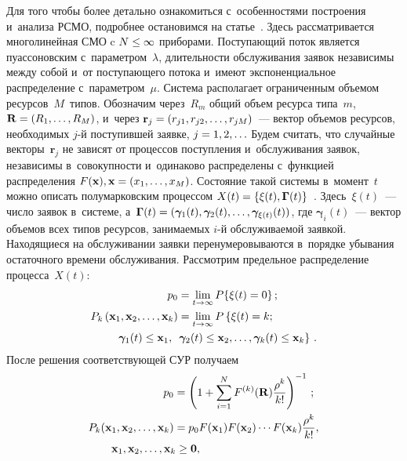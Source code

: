 \begin{multicols}{2}
Для того чтобы более детально ознакомиться с~особенностями построения и~анализа 
РСМО, подробнее остановимся на статье~\cite{Naumov_3_2016}.
Здесь рас\-смат\-ри\-ва\-ет\-ся многолинейная СМО c $N\hm\leq \infty$ приборами. Поступающий 
поток является пуассоновским с~па\-ра\-мет\-ром~$\lambda$, длительности обслуживания 
заявок независимы между собой и~от поступающего потока и~имеют экспоненциальное 
распределение с~параметром~$\mu$. Система располагает ограниченным объемом 
ресурсов~$M$~типов.
Обозначим через~$R_m$ общий объем ресурса типа~$m$, $\mathbf{R}\hm=(R_1,\ldots,R_M)$, 
и~через $\mathbf{r}_j\hm=(r_{j1}, r_{j2},\ldots, r_{jM})$~--- вектор объемов 
ресурсов, необходимых $j$-й поступившей заявке, $j \hm= 1, 2,\ldots$
Будем считать, что случайные векторы~$\mathbf{r}_j$ не зависят от процессов 
поступления и~обслуживания заявок, независимы в~совокупности и~одинаково 
распределены с~функцией распределения $F(\mathbf{x}), \mathbf{x}\hm=(x_1,\ldots,x_M)$.
Состояние такой системы в~момент~$t$ можно описать полумарковским процессом 
$X(t)\hm=\{\xi(t),\boldsymbol{\Gamma}(t)\}$~\cite{Naumov_3_2016}. Здесь~$\xi(t)$~--- 
число заявок в~сис\-те\-ме, а~$\mathbf{\Gamma}(t)\hm=
(\boldsymbol{\gamma}_1(t),\boldsymbol{\gamma}_2(t),\ldots,\boldsymbol{\gamma}_{\xi(t)}
(t))$, где $\boldsymbol{\gamma}_i(t)$~--- вектор объемов 
всех типов ресурсов, занимаемых $i$-й обслуживаемой заявкой. Находящиеся на 
обслуживании заявки перенумеровываются в~порядке убывания остаточного времени 
обслуживания.
Рассмотрим предельное распределение процесса~$X(t):$
\begin{align*}
p_0&=\lim_{t\rightarrow \infty}P\{\xi(t)=0\}\,;
\\
P_k\left(\mathbf{x}_1,\mathbf{x}_2,\ldots,\mathbf{x}_k\right)&=\lim\limits_{t\rightarrow 
\infty} P
\left\{\xi(t)=k;\right.\\
&
 \hspace*{-20mm}\left.\boldsymbol{\gamma}_1(t)\leq 
\mathbf{x}_1,\enskip
\boldsymbol{\gamma}_2(t)\leq 
\mathbf{x}_2,\ldots,\boldsymbol{\gamma}_k(t)\leq \mathbf{x}_k\right\}\,.
\end{align*}
После решения соответствующей СУР получаем
\begin{align*}
p_0&=\left(1+\sum\limits_{i=1}^{N}F^{(k)}(\mathbf{R})\fr{\rho^k}{k!}     \right)^{-1}\,;\\
P_k(\mathbf{x}_1,\mathbf{x}_2,\ldots,\mathbf{x}_k)&=p_0F(\mathbf{x}_1)F(\mathbf{x}_2
)\cdots F(\mathbf{x}_k)\frac{\rho^k}{k!},\\
&\hspace*{-20mm}\mathbf{x}_1,\mathbf{x}_2,\ldots,\mathbf{x}_k \geq \mathbf{0}, \enskip 

\end{align*}
\end{multicols}
